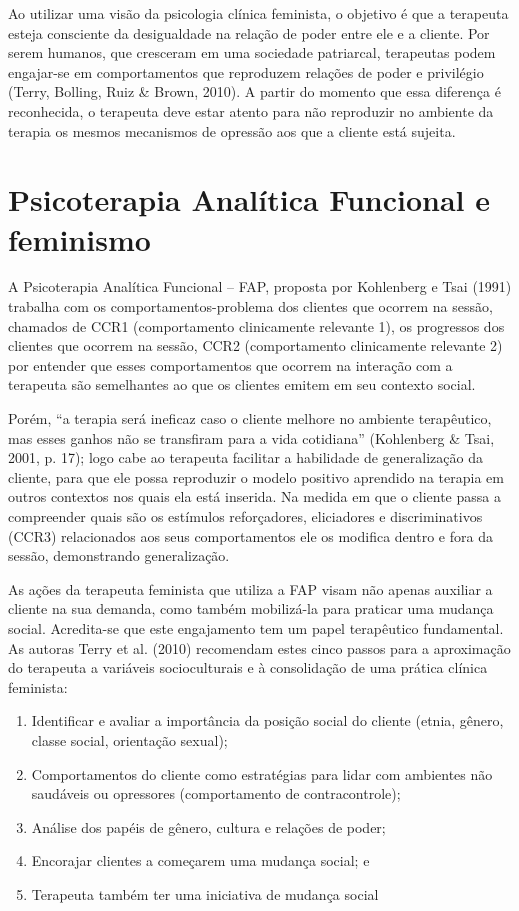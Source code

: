 Ao utilizar uma visão da psicologia clínica feminista, o objetivo é que a terapeuta esteja consciente da desigualdade na relação de poder entre ele e a cliente. Por serem humanos, que cresceram em uma sociedade patriarcal, terapeutas podem engajar-se em comportamentos que reproduzem relações de poder e privilégio (Terry, Bolling, Ruiz \& Brown, 2010). A partir do momento que essa diferença é reconhecida, o terapeuta deve estar atento para não reproduzir no ambiente da terapia os mesmos mecanismos de opressão aos que a cliente está sujeita. 

\section*{Psicoterapia Analítica Funcional e feminismo}

A Psicoterapia Analítica Funcional – FAP, proposta por Kohlenberg e Tsai (1991) trabalha com os comportamentos-problema dos clientes que ocorrem na sessão, chamados de CCR1 (comportamento clinicamente relevante 1), os progressos dos clientes que ocorrem na sessão, CCR2 (comportamento clinicamente relevante 2) por entender que esses comportamentos que ocorrem na interação com a terapeuta são semelhantes ao que os clientes emitem em seu contexto social.

Porém, ``a terapia será ineficaz caso o cliente melhore no ambiente terapêutico, mas esses ganhos não se transfiram para a vida cotidiana'' (Kohlenberg \& Tsai, 2001, p. 17); logo cabe ao terapeuta facilitar a habilidade de generalização da cliente, para que ele possa reproduzir o modelo positivo aprendido na terapia em outros contextos nos quais ela está inserida. Na medida em que o cliente passa a compreender quais são os estímulos reforçadores, eliciadores e discriminativos (CCR3) relacionados aos seus comportamentos ele os modifica dentro e fora da sessão, demonstrando generalização.

As ações da terapeuta feminista que utiliza a FAP visam não apenas auxiliar a cliente na sua demanda, como também mobilizá-la para praticar uma mudança social. Acredita-se que este engajamento tem um papel terapêutico fundamental. As autoras Terry et al. (2010) recomendam estes cinco passos para a aproximação do terapeuta a variáveis socioculturais e à consolidação de uma prática clínica feminista: 

\begin{enumerate}
    \item Identificar e avaliar a importância da posição social do cliente (etnia, gênero, classe social, orientação sexual);
    \item Comportamentos do cliente como estratégias para lidar com ambientes não saudáveis ou opressores (comportamento de contracontrole);
    \item Análise dos papéis de gênero, cultura e relações de poder;
    \item Encorajar clientes a começarem uma mudança social; e
    \item Terapeuta também ter uma iniciativa de mudança social
\end{enumerate}

